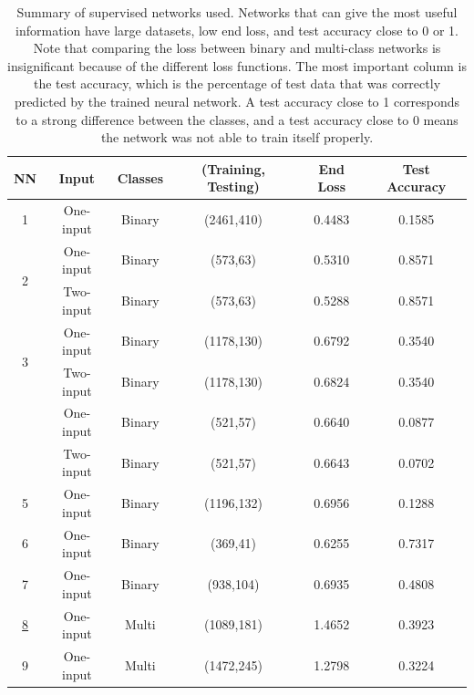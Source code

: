 \documentclass[a4paper]{article}
\begin{document}
\begin{table}[h!]
\centering
\begin{tabular}{||c c c c c c||} 
 \hline
 NN & Input & Classes & (Training, Testing) & End Loss & Test Accuracy \\ [0.5ex] 
 \hline\hline
 1 & One-input & Binary & (2461,410) & 0.4483 & 0.1585 \\
 \multirow{2}{*}{\hfil 2} & One-input & Binary & (573,63) & 0.5310 & 0.8571 \\ 
  & Two-input & Binary & (573,63) & 0.5288 & 0.8571 \\ 
  \multirow{2}{*}{\hfil 3} & One-input & Binary & (1178,130) & 0.6792 & 0.3540 \\ 
  & Two-input & Binary & (1178,130) & 0.6824 & 0.3540 \\
 \rowcolor{pink}
  & One-input & Binary & (521,57) & 0.6640 & 0.0877 \\
  \rowcolor{pink}
 \multirow{-2}{*}{\hfil \hyperlink{binary}{4}}& Two-input & Binary & (521,57) & 0.6643 & 0.0702 \\
 5 & One-input & Binary & (1196,132) & 0.6956 & 0.1288 \\
 6 & One-input & Binary & (369,41) & 0.6255 & 0.7317 \\
 7 & One-input & Binary & (938,104) & 0.6935 & 0.4808 \\
 \rowcolor{pink}
 \hyperlink{multi}{8} & One-input & Multi & (1089,181) & 1.4652 & 0.3923 \\
 9 & One-input & Multi & (1472,245) & 1.2798 & 0.3224 \\
 \hline
\end{tabular}
\caption{Summary of supervised networks used. Networks that can give the most useful information have large datasets, low end loss, and test accuracy close to 0 or 1. Note that comparing the loss between binary and multi-class networks is insignificant because of the different loss functions. The most important column is the test accuracy, which is the percentage of test data that was correctly predicted by the trained neural network. A test accuracy close to 1 corresponds to a strong difference between the classes, and a test accuracy close to 0 means the network was not able to train itself properly. }
\label{table:1}
\end{table}
\end{document}
